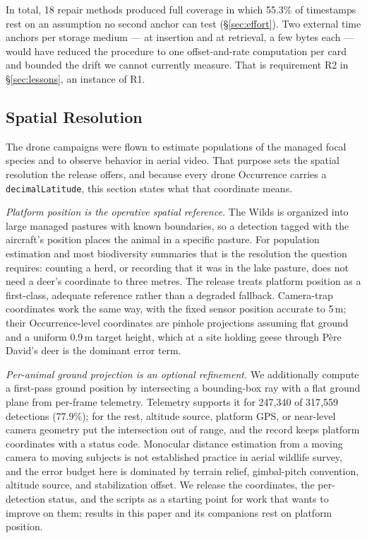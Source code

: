 \documentclass[sigconf]{acmart}
\begin{document}
In total, 18 repair methods produced full coverage in which 55.3\% of
timestamps rest on an assumption no second anchor can test
(\S\ref{sec:effort}). Two external time anchors per storage medium --- at
insertion and at retrieval, a few bytes each --- would have reduced the
procedure to one offset-and-rate computation per card and bounded the
drift we cannot currently measure. That is requirement R2 in
\S\ref{sec:lessons}, an instance of R1.

\subsection{Spatial Resolution}
\label{sec:scope}

The drone campaigns were flown to estimate populations of the managed
focal species and to observe behavior in aerial video. That purpose
sets the spatial resolution the release offers, and because every drone
Occurrence carries a \texttt{decimalLatitude}, this section states what
that coordinate means.

\emph{Platform position is the operative spatial reference.} The Wilds is organized into large managed pastures with known
boundaries, so a detection tagged with the aircraft's position places
the animal in a specific pasture. For population estimation and most
biodiversity summaries that is the resolution the question requires:
counting a herd, or recording that it was in the lake pasture, does not
need a deer's coordinate to three metres. The release treats platform
position as a first-class, adequate reference rather than a degraded
fallback. Camera-trap coordinates work the same way, with the fixed
sensor position accurate to 5\,m; their Occurrence-level coordinates are
pinhole projections assuming flat ground and a uniform 0.9\,m target
height, which at a site holding geese through Père David's deer is the
dominant error term.

\emph{Per-animal ground projection is an optional refinement.} We
additionally compute a first-pass ground position by intersecting a
bounding-box ray with a flat ground plane from per-frame telemetry.
Telemetry supports it for 247{,}340 of 317{,}559 detections (77.9\%);
for the rest, altitude source, platform GPS, or near-level camera
geometry put the intersection out of range, and the record keeps
platform coordinates with a status code. Monocular distance estimation
from a moving camera to moving subjects is not established practice in
aerial wildlife survey, and the error budget here is dominated by
terrain relief, gimbal-pitch convention, altitude source, and
stabilization offset. We release the coordinates, the per-detection
status, and the scripts as a starting point for work that wants to
improve on them; results in this paper and its companions rest on
platform position.
\end{document}
